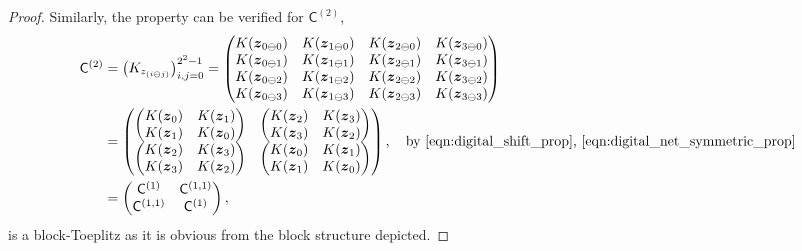 \documentclass{iitthesis}          %
\newcommand{\bm}[1]{\boldsymbol{#1}}
\newcommand{\vz}{\bm{z}}
\newcommand{\mC}{\mathsf{C}}
\begin{document}
\begin{proof}
Similarly, the property can be verified for $\mC^{(2)}$, 
\begin{align*}
\mC^{(2)} &= 
\begin{pmatrix}
K_{z_{(i \ominus j )}}
\end{pmatrix}_{i,j=0}^{2^2-1}
=
\begin{pmatrix}
K(\vz_{0 \ominus 0}) & K(\vz_{1 \ominus 0}) & K(\vz_{2 \ominus 0}) & K(\vz_{3 \ominus 0}) \\
K(\vz_{0 \ominus 1}) & K(\vz_{1 \ominus 1}) & K(\vz_{2 \ominus 1}) & K(\vz_{3 \ominus 1}) \\
K(\vz_{0 \ominus 2}) & K(\vz_{1 \ominus 2}) & K(\vz_{2 \ominus 2}) & K(\vz_{3 \ominus 2}) \\
K(\vz_{0 \ominus 3}) & K(\vz_{1 \ominus 3}) & K(\vz_{2 \ominus 3}) & K(\vz_{3 \ominus 3}) 
\end{pmatrix} \\
& = 
\begin{pmatrix}
\begin{pmatrix}
K(\vz_{0}) & K(\vz_{1}) \\
K(\vz_{1}) & K(\vz_{0})
\end{pmatrix} &
\begin{pmatrix}
K(\vz_{2}) & K(\vz_{3}) \\
K(\vz_{3}) & K(\vz_{2}) 
\end{pmatrix} \\
\begin{pmatrix}
K(\vz_{2}) & K(\vz_{3}) \\
K(\vz_{3}) & K(\vz_{2}) 
\end{pmatrix} &
\begin{pmatrix}
K(\vz_{0}) & K(\vz_{1}) \\
K(\vz_{1}) & K(\vz_{0})
\end{pmatrix} 
\end{pmatrix}, \quad \text{by \ref{eqn:digital_shift_prop}, \ref{eqn:digital_net_symmetric_prop}}
\\
& =
\begin{pmatrix}
\mC^{(1)} & \mC^{(1,1)} \\
\mC^{(1,1)} & \mC^{(1)}
\end{pmatrix},
\end{align*}
is a block-Toeplitz as it is obvious from the block structure depicted. 
\fi


\end{proof}
\end{document}

